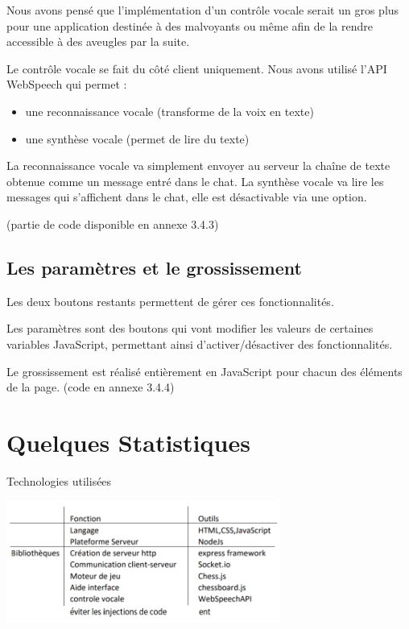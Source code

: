 \documentclass[12pt, openany]{report}
\begin{document}
Nous avons pensé que l'implémentation d'un contrôle vocale serait un gros plus pour une application destinée à des malvoyants ou même afin de la rendre accessible à des aveugles par la suite.

Le contrôle vocale se fait du côté client uniquement.
Nous avons utilisé l'API WebSpeech qui permet :
\begin{itemize}
    \item une reconnaissance vocale (transforme de la voix en texte)
    \item une synthèse vocale (permet de lire du texte)
\end{itemize} 

La reconnaissance vocale va simplement envoyer au serveur la chaîne de texte obtenue comme un message entré dans le chat.
La synthèse vocale va lire les messages qui s'affichent dans le chat, elle est désactivable via une option.

(partie de code disponible en annexe 3.4.3)

\subsection{Les paramètres et le grossissement}

Les deux boutons restants permettent de gérer ces fonctionnalités.

Les paramètres sont des boutons qui vont modifier les valeurs de certaines variables JavaScript, permettant ainsi d'activer/désactiver des fonctionnalités.

Le grossissement est réalisé entièrement en JavaScript pour chacun des éléments de la page.
(code en annexe 3.4.4)

\section{Quelques Statistiques}

Technologies utilisées
\begin{center}
    \centering
    \includegraphics[width=9cm]{src/image5.png}
\end{center}
\end{document}
